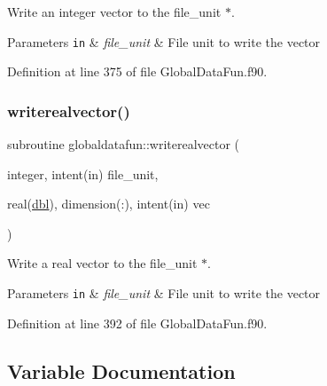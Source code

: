 Write an integer vector to the file\+\_\+unit $\ast$. 


\begin{DoxyParams}[1]{Parameters}
\mbox{\tt in}  & {\em file\+\_\+unit} & File unit to write the vector \\
\hline
\end{DoxyParams}


Definition at line 375 of file Global\+Data\+Fun.\+f90.

\mbox{\label{namespaceglobaldatafun_a6a36231350f9af76a3a20cd590f6e40a}} 
\subsubsection{\texorpdfstring{writerealvector()}{writerealvector()}}
{\footnotesize\ttfamily subroutine globaldatafun\+::writerealvector (\begin{DoxyParamCaption}\item[{integer, intent(in)}]{file\+\_\+unit,  }\item[{real(\hyperlink{namespaceglobaldatafun_a5008801201dd34f2af8eae07756befb4}{dbl}), dimension(\+:), intent(in)}]{vec }\end{DoxyParamCaption})\hspace{0.3cm}{\ttfamily [private]}}



Write a real vector to the file\+\_\+unit $\ast$. 


\begin{DoxyParams}[1]{Parameters}
\mbox{\tt in}  & {\em file\+\_\+unit} & File unit to write the vector \\
\hline
\end{DoxyParams}


Definition at line 392 of file Global\+Data\+Fun.\+f90.



\subsection{Variable Documentation}
\mbox{\label{namespaceglobaldatafun_ac0c29e0202eb23daead1a4fcecc645ea}} 
